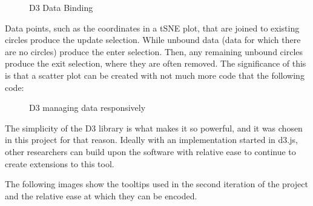 \documentclass[a4paper,11pt,titlepage]{article}
\begin{document}
	\begin{figure}[H]
    			\caption{D3 Data Binding}%
	\end{figure}	
	
	Data points, such as the coordinates in a tSNE plot, that are joined to existing circles produce the update selection. While unbound data (data for which there are no circles) produce the enter selection. Then, any remaining unbound circles produce the exit selection, where they are often removed. The significance of this is that a scatter plot can be created with not much more code that the following code:
	
	\begin{figure}[H]
    			\caption{D3 managing data responsively}%
	\end{figure}	
	
	The simplicity of the D3 library is what makes it so powerful, and it was chosen in this project for that reason. Ideally with an implementation started in d3.js, other researchers can build upon the software with relative ease to continue to create extensions to this tool. 
	\par 
	The following images show the tooltips used in the second iteration of the project and the relative ease at which they can be encoded.
	
\end{document}
